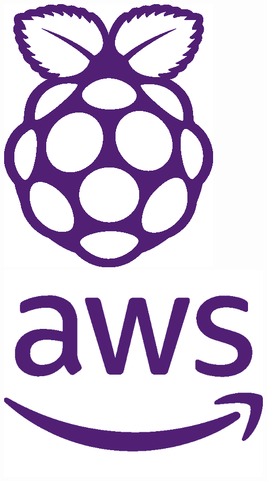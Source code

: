\includegraphics[scale=0.05]{img/raspberry-pi.png}
\includegraphics[scale=0.05]{img/aws-brands.png}
